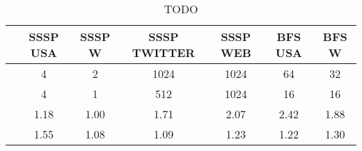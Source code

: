 \begin{table}[h]
\centring
\begin{tabular}{ |c|c|c|c|c|c|c| }
\hline
 & \large{\textbf{SSSP USA}} & \large{\textbf{SSSP W}} & \large{\textbf{SSSP TWITTER}} & \large{\textbf{SSSP WEB}} & \large{\textbf{BFS USA}} & \large{\textbf{BFS W}} \\
\hline
\insbatch{} & 4 & 2 & 1024 & 1024 & 64 & 32 \\
\hline
\delbatch{} & 4 & 1 & 512 & 1024 & 16 & 16 \\
\hline
\speed{} & 1.18 & 1.00 & 1.71 & 2.07 & 2.42 & 1.88 \\
\hline
\workinc{} & 1.55 & 1.08 & 1.09 & 1.23 & 1.22 & 1.30 \\
\hline
\end{tabular}
\vspace{0.3em}
\caption{TODO }
\label{table:todo}
\end{table}
